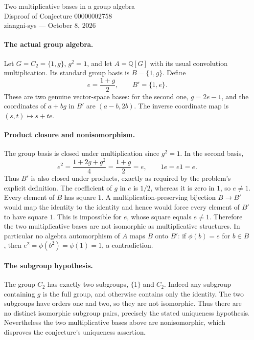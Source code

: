 \documentclass[11pt]{article}
\begin{document}
\begin{center}
{\Large Two multiplicative bases in a group algebra}\\[4pt]
Disproof of Conjecture 00000002758\\[4pt]
ziangni-sys --- October 8, 2026
\end{center}
\paragraph{The actual group algebra.}
Let $G=C_2=\{1,g\}$, $g^2=1$, and let $A=\mathbb Q[G]$ with its
usual convolution multiplication. Its standard group basis is
$B=\{1,g\}$. Define
\[
 e=\frac{1+g}{2},\qquad B'=\{1,e\}.
\]
These are two genuine vector-space bases: for the second one,
$g=2e-1$, and the coordinates of $a+bg$ in $B'$ are $(a-b,2b)$.
The inverse coordinate map is $(s,t)\mapsto s+te$.

\paragraph{Product closure and nonisomorphism.}
The group basis is closed under multiplication since $g^2=1$.
In the second basis,
\[
 e^2=\frac{1+2g+g^2}{4}=\frac{1+g}{2}=e,
 \qquad 1e=e1=e.
\]
Thus $B'$ is also closed under products, exactly as required by
the problem's explicit definition. The coefficient of $g$ in $e$
is $1/2$, whereas it is zero in $1$, so $e\ne1$.
Every element of $B$ has square $1$. A multiplication-preserving
bijection $B\to B'$ would map the identity to the identity and hence
would force every element of $B'$ to have square $1$. This is
impossible for $e$, whose square equals $e\ne1$. Therefore the two
multiplicative bases are not isomorphic as multiplicative structures.
In particular no algebra automorphism of $A$ maps $B$ onto $B'$:
if $\phi(b)=e$ for $b\in B$, then $e^2=\phi(b^2)=\phi(1)=1$,
a contradiction.

\paragraph{The subgroup hypothesis.}
The group $C_2$ has exactly two subgroups, $\{1\}$ and $C_2$.
Indeed any subgroup containing $g$ is the full group, and otherwise
contains only the identity. The two subgroups have orders one and
two, so they are not isomorphic. Thus there are no distinct
isomorphic subgroup pairs, precisely the stated uniqueness hypothesis.
Nevertheless the two multiplicative bases above are nonisomorphic,
which disproves the conjecture's uniqueness assertion.
\end{document}

